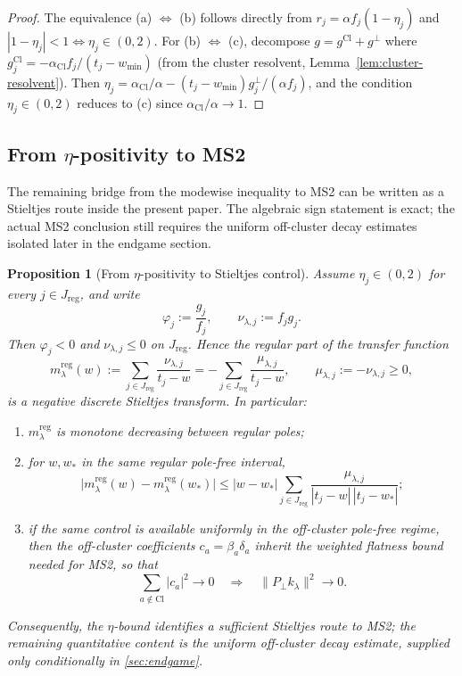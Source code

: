 \documentclass[12pt,a4paper]{article}
\newtheorem{proposition}[theorem]{Proposition}
\theoremstyle{definition}
\theoremstyle{remark}
\newcommand{\Cl}{\mathrm{Cl}}
\newcommand{\reg}{\mathrm{reg}}
\newcommand{\norm}[1]{\| #1 \|}
\newcommand{\wmin}{w_{\min}}
\begin{document}
\begin{proof}
The equivalence (a) $\Leftrightarrow$ (b) follows directly from
$r_j = \alpha f_j(1 - \eta_j)$ and $|1 - \eta_j| < 1 \Leftrightarrow \eta_j \in (0,2)$.
For (b) $\Leftrightarrow$ (c), decompose $g = g^{\Cl} + g^\perp$ where
$g_j^{\Cl} = -\alpha_{\Cl} f_j / (t_j - \wmin)$
(from the cluster resolvent, Lemma~\ref{lem:cluster-resolvent}).
Then $\eta_j = \alpha_{\Cl}/\alpha - (t_j - \wmin) g_j^\perp / (\alpha f_j)$,
and the condition $\eta_j \in (0,2)$ reduces to (c) since
$\alpha_{\Cl}/\alpha \to 1$.
\end{proof}

\subsection{From \texorpdfstring{$\eta$}{eta}-positivity to MS2}

The remaining bridge from the modewise inequality to MS2 can be written
as a Stieltjes route inside the present paper.  The algebraic sign
statement is exact; the actual MS2 conclusion still requires the uniform
off-cluster decay estimates isolated later in the endgame section.

\begin{proposition}[From $\eta$-positivity to Stieltjes control]
\label{prop:eta-to-ms2}
Assume $\eta_j \in (0,2)$ for every $j \in J_{\reg}$, and write
\[
  \varphi_j := \frac{g_j}{f_j},
  \qquad
  \nu_{\lambda,j} := f_j g_j.
\]
Then $\varphi_j < 0$ and $\nu_{\lambda,j} \le 0$ on $J_{\reg}$.  Hence
the regular part of the transfer function
\[
  m_\lambda^{\reg}(w)
  :=
  \sum_{j \in J_{\reg}} \frac{\nu_{\lambda,j}}{t_j-w}
  =
  - \sum_{j \in J_{\reg}} \frac{\mu_{\lambda,j}}{t_j-w},
  \qquad
  \mu_{\lambda,j} := - \nu_{\lambda,j} \ge 0,
\]
is a negative discrete Stieltjes transform.  In particular:
\begin{enumerate}[label=(\roman*)]
\item $m_\lambda^{\reg}$ is monotone decreasing between regular poles;
\item for $w,w_\ast$ in the same regular pole-free interval,
\[
  \bigl|m_\lambda^{\reg}(w)-m_\lambda^{\reg}(w_\ast)\bigr|
  \le
  |w-w_\ast|
  \sum_{j\in J_{\reg}}
  \frac{\mu_{\lambda,j}}{|t_j-w|\,|t_j-w_\ast|};
\]
\item if the same control is available uniformly in the off-cluster
  pole-free regime, then the off-cluster coefficients
  $c_a = \beta_a\delta_a$ inherit the weighted flatness bound needed for
  MS2, so that
\[
  \sum_{a\notin \Cl} |c_a|^2 \to 0
  \quad\Longrightarrow\quad
  \norm{P_\perp k_\lambda}^2 \to 0.
\]
\end{enumerate}
Consequently, the $\eta$-bound identifies a sufficient Stieltjes route to
MS2; the remaining quantitative content is the uniform off-cluster decay
estimate, supplied only conditionally in \cref{sec:endgame}.
\end{proposition}
\end{document}
